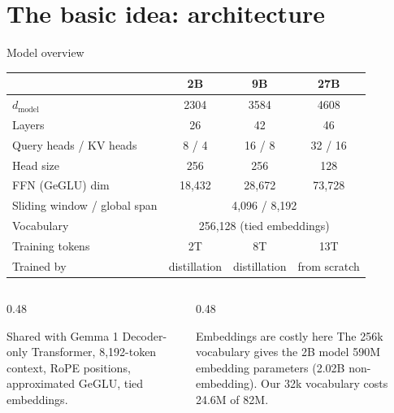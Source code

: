 \documentclass[aspectratio=169,11pt]{beamer}
\begin{document}
\section{The basic idea: architecture}

\begin{frame}{Model overview}
  \centering
  \footnotesize
  \begin{tabular}{@{}lccc@{}}
        \toprule
        & 2B & 9B & 27B\\
        \midrule
        $d_{\text{model}}$ & 2304 & 3584 & 4608\\
        Layers & 26 & 42 & 46\\
        Query heads / KV heads & 8 / 4 & 16 / 8 & 32 / 16\\
        Head size & 256 & 256 & 128\\
        FFN (GeGLU) dim & 18,432 & 28,672 & 73,728\\
        Sliding window / global span & \multicolumn{3}{c}{4,096 / 8,192}\\
        Vocabulary & \multicolumn{3}{c}{256,128 (tied embeddings)}\\
        Training tokens & 2T & 8T & 13T\\
        Trained by & distillation & distillation & from scratch\\
        \bottomrule
      \end{tabular}
  \vspace{2mm}

  \raggedright
  \begin{columns}[T]
    \begin{column}{0.48\textwidth}
      \begin{block}{Shared with Gemma 1}
        \small
        Decoder-only Transformer, 8,192-token context, RoPE positions, approximated GeGLU, tied embeddings.
      \end{block}
    \end{column}
    \begin{column}{0.48\textwidth}
      \begin{exampleblock}{Embeddings are costly here}
        \small
        The 256k vocabulary gives the 2B model 590M embedding parameters (2.02B non-embedding). Our 32k vocabulary costs 24.6M of 82M.
      \end{exampleblock}
    \end{column}
  \end{columns}
\end{frame}
\end{document}
